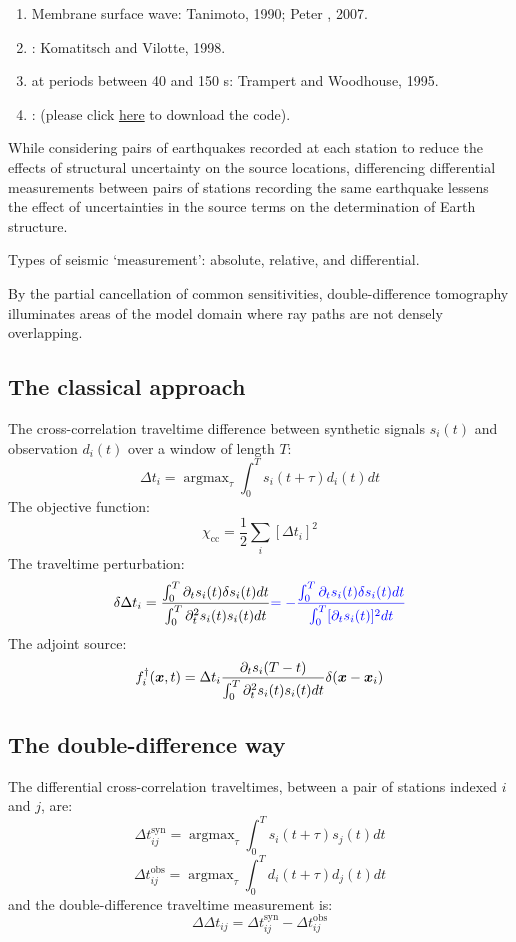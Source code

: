 \begin{enumerate}[\hspace{10mm}*]
  \item Membrane surface wave: Tanimoto, 1990; Peter \etal, 2007.
  \item {}
    :
    Komatitsch and Vilotte, 1998.
  \item {} at periods between 40 and 150 s:
    Trampert and Woodhouse, 1995.
  \item {}
    :
     (please click \href{https://github.com/yanhuay/seisDD}{here}
    to download the code).
\end{enumerate}

While considering pairs of earthquakes recorded at each station to reduce
the effects of structural uncertainty on the source locations,
differencing differential measurements between pairs of stations recording
the same earthquake lessens the effect of uncertainties in the source terms
on the determination of Earth structure.

Types of seismic `measurement': absolute, relative, and differential.

By the partial cancellation of common sensitivities, double-difference
tomography illuminates areas of the model domain where ray paths are not
densely overlapping.

\subsection{The classical approach}
The cross-correlation traveltime difference between synthetic signals $s_i(t)$
and observation $d_i(t)$ over a window of length $T$:
\[ \Delta t_i = \mathop{\arg\max}_\tau \int_0^T s_i(t + \tau) d_i(t) dt \]
The objective function:
\[ \chi_\text{cc} = \frac{1}{2} \sum_i [\Delta t_i]^2 \]
The traveltime perturbation:
\[ \delta \Delta t_i = \frac{ \int_0^T \partial_t s_i(t) \delta s_i(t) dt }
  { \int_0^T \partial_t^2 s_i(t) s_i(t) dt }
  {\color{blue} = - \frac{ \int_0^T \partial_t s_i(t) \delta s_i(t) dt }
  { \int_0^T [ \partial_t s_i(t) ]^2 dt } } \]
The adjoint source:
\[ f_i^\dagger(\boldsymbol{x}, t) = \Delta t_i \frac{ \partial_t s_i(T - t) }
  { \int_0^T \partial_t^2 s_i(t) s_i(t) dt } \delta(\boldsymbol{x} - \boldsymbol{x}_i) \]

\subsection{The double-difference way}
The differential cross-correlation traveltimes, between a pair of stations
indexed $i$ and $j$, are:
\[ \Delta t_{ij}^\text{syn} = \mathop{\arg\max}_\tau
  \int_0^T s_i(t + \tau) s_j(t) dt \]
\[ \Delta t_{ij}^\text{obs} = \mathop{\arg\max}_\tau
  \int_0^T d_i(t + \tau) d_j(t) dt \]
and the double-difference traveltime measurement is:
\[ \Delta\Delta t_{ij} = \Delta t_{ij}^\text{syn} - \Delta t_{ij}^\text{obs} \]

